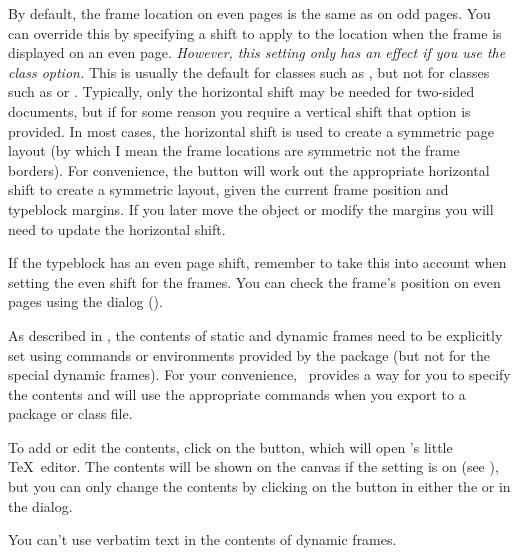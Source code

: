 
By default, the frame location on even pages is the same
 as on odd pages. You can override this by
specifying a shift to apply to the location when the frame is
displayed on an even page. \emph{However, this setting only has an effect
if you use the  class option.} This is usually
the default for classes such as , but not for classes
such as  or . Typically, only the
horizontal shift may be needed for two-sided documents, but if for some
reason you require a vertical shift that option is provided. In most
cases, the horizontal shift is used to create a symmetric page
layout (by which I mean the frame locations are symmetric not the
frame borders). For convenience, the
 button will work out
the appropriate horizontal shift to create a symmetric layout, given
the current frame position and \gls{typeblock} margins. If you later move
the \gls{object} or modify the margins you will need to update the
horizontal shift.

\begin{warning}
If the \gls{typeblock} has an even page shift, remember to take this into
account when setting the even shift for the frames. You can check
the frame's position on even pages using the 
dialog ().
\end{warning}


As described in , the contents of
static and dynamic frames need to be explicitly set using commands
or environments provided by the  package (but not for
the special dynamic frames). For your
convenience, \FlowframTk\ provides a way for you to specify the
contents and will use the appropriate commands when you export to a
package or class file.

To add or edit the contents, click on the
 button, which will open
\FlowframTk's little \TeX\ editor.
The contents will be shown on the \gls{canvas} if the
 setting is on
(see ), but you can only change
the contents by clicking on the 
button in either the  or in the
 dialog.

\begin{important}
You can't use verbatim text in the contents of dynamic frames.
\end{important}


